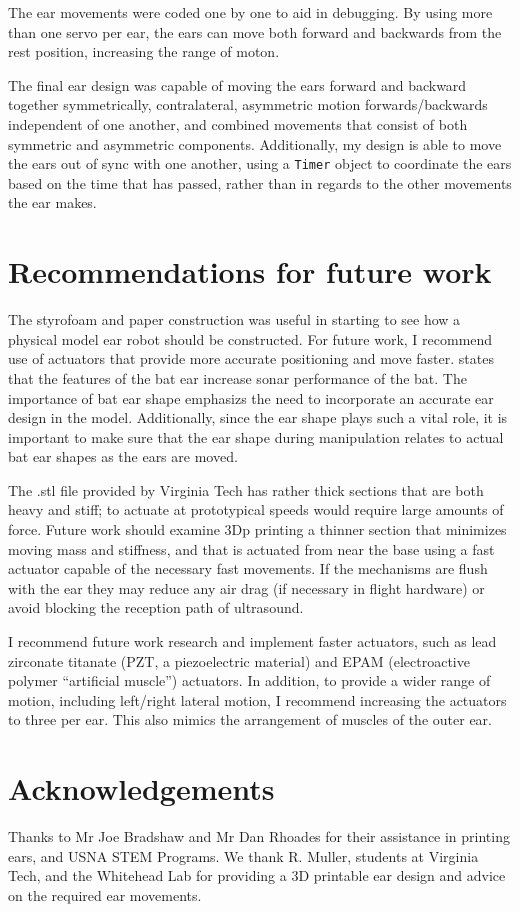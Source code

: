 \documentclass{article}
\begin{document}
The ear movements were coded one by one to aid in debugging. By using more than one servo per ear, the ears can move both forward and backwards from the rest position, increasing the range of moton.  

The final ear design was capable of moving the ears forward and backward together symmetrically, contralateral, asymmetric motion forwards/backwards independent of one another, and combined movements that consist of both symmetric and asymmetric components. Additionally, my design is able to move the ears out of sync with one another, using a \lstinline{Timer} object to coordinate the ears based on the time that has passed, rather than in regards to the other movements the ear makes.  






\section{Recommendations for future work}
The styrofoam and paper construction was useful in starting to see how a physical model ear robot should be constructed. For future work, I recommend use of actuators that provide more accurate positioning and move faster. \citep{pannala2013interplay} states that the features of the bat ear increase sonar performance of the bat. The importance of bat ear shape emphasizs the need to incorporate an accurate ear design in the model. Additionally, since the ear shape plays such a vital role, it is important to make sure that the ear shape during manipulation relates to actual bat ear shapes as the ears are moved. 

The .stl file provided by Virginia Tech has rather thick sections that are both heavy and stiff; to actuate at prototypical speeds would require large amounts of force.  Future work should examine 3Dp printing a thinner section that minimizes moving mass and stiffness, and that is actuated from near the base using a fast actuator capable of the necessary fast movements. If the mechanisms are flush with the ear they may reduce any air drag (if necessary in flight hardware) or avoid blocking the reception path of ultrasound. 

I recommend future work research and implement faster actuators, such as lead zirconate titanate (PZT, a piezoelectric material) and EPAM (electroactive polymer ``artificial muscle'') actuators. In addition, to provide a wider range of motion, including left/right lateral motion, I recommend increasing the actuators to three per ear. This also mimics the arrangement of muscles of the outer ear. 

\section*{Acknowledgements}
Thanks to Mr Joe Bradshaw and Mr Dan Rhoades for their assistance in printing ears, and USNA STEM Programs. We thank R. Muller, students at Virginia Tech, and the Whitehead Lab for providing a 3D printable ear design and advice on the required ear movements. 


\end{document}
